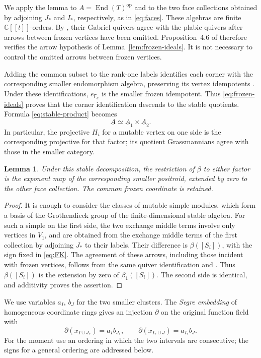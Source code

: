 \documentclass[11pt]{amsart}
\numberwithin{equation}{section}
\newtheorem{lemma}[theorem]{Lemma}
\theoremstyle{definition}
\theoremstyle{remark}
\newcommand{\op}[1]{\operatorname{#1}}
\newcommand{\End}{\op{End}}
\begin{document}
We apply the lemma to $A=\End(T)^{\mathrm{op}}$ and to the two
face collections obtained by adjoining $J_*$ and $I_*$, respectively,
as in \eqref{eq:faces}. These algebras are finite
$\mathbb C[[t]]$-orders. By \cite[Theorem~6.5]{JRS26}, their
Gabriel quivers agree with the plabic quivers after arrows between
frozen vertices have been omitted. Proposition~4.6 of \cite{Pre}
therefore verifies the arrow hypothesis of Lemma~\ref{lem:frozen-ideals}.
It is not necessary to control the omitted arrows between frozen vertices.

Adding the common subset to the rank-one labels identifies each corner
with the corresponding smaller endomorphism algebra, preserving its
vertex idempotents \cite[Corollary~6.4]{JRS26}. Under these
identifications, $e_{\mathsf F_a}$ is the smaller frozen idempotent. Thus
\eqref{eq:frozen-ideals} proves that the corner identification descends
to the stable quotients. Formula \eqref{eq:stable-product} becomes
\[ \underline A\simeq\underline A_1\times\underline A_2. \]
In particular, the projective $H_i$ for a mutable vertex on one side
is the corresponding projective for that factor; its quotient
Grassmannians agree with those in the smaller category.

\begin{lemma}\label{lem:beta-gluing}
Under this stable decomposition, the restriction of $\beta$ to either
factor is the exponent map of the corresponding smaller positroid, extended by zero to the other face
collection. The common frozen coordinate is retained.
\end{lemma}

\begin{proof}
It is enough to consider the classes of mutable simple modules, which
form a basis of the Grothendieck group of the finite-dimensional stable
algebra. For such a simple on the first side, the two exchange middle
terms involve only vertices in $V_1$, and are obtained from the exchange middle terms of the first collection by
adjoining $J_*$ to their labels. Their difference is
$\beta([S_i])$, with the sign fixed in \eqref{eq:FK}.
The agreement of these arrows, including those incident with frozen
vertices, follows from the same quiver identification and
\cite[Proposition~4.6]{Pre}. Thus $\beta([S_i])$ is the extension
by zero of $\beta_1([S_i])$. The second side is identical, and
additivity proves the assertion.
\end{proof}
We use variables $a_I$, $b_J$ for the two smaller clusters. The
\emph{Segre embedding} of homogeneous coordinate rings gives an injection
$\partial$ on the original function field with
\begin{equation}\label{eq:Segre} \partial(x_{I\cup J_*})=a_Ib_{J_*},\qquad \partial(x_{I_*\cup J})=a_{I_*}b_J.\end{equation}
For the moment use an ordering in which the two intervals are consecutive;
the signs for a general ordering are addressed below.
\end{document}
